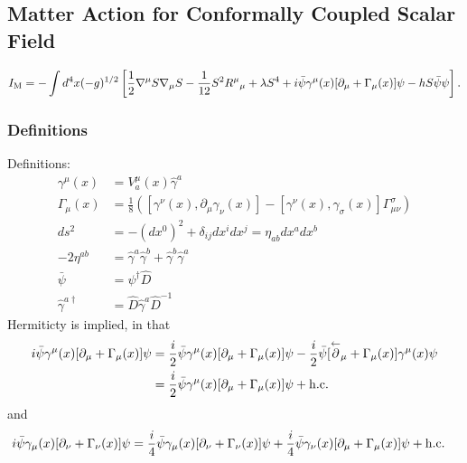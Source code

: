 \documentclass[10pt,letterpaper]{article}
\numberwithin{equation}{subsection}
\begin{document}

\subsection{Matter Action for Conformally Coupled Scalar Field}
\begin{equation}
	I_{\rm M} = -\int d^4x(-g)^{1/2} \left[ \frac12 \nabla^\mu S \nabla_\mu S - \frac{1}{12} S^2 R^{\mu}{}_{\mu} + \lambda S^4 
+ i\bar\psi\gamma^\mu(x)[\partial_\mu + \Gamma_\mu(x)]\psi -hS\bar\psi\psi\right]\label{GRW1}.
\end{equation}


\subsubsection{Definitions}
Definitions:
\begin{align}
\gamma^\mu(x) &= V^\mu_a(x)\hat \gamma ^a
\nonumber\\
\Gamma_\mu(x) &= \frac{1}{8}\left( [\gamma^\nu(x),\partial_\mu\gamma_\nu(x)] -[\gamma^\nu(x),\gamma_\sigma(x)]\Gamma^\sigma_{\mu\nu} \right)
\nonumber\\
ds^2 &= -(dx^0)^2 + \delta_{ij}dx^idx^j = \eta_{ab}dx^a dx^b
\nonumber\\
-2\eta^{ab} &= \hat \gamma^a \hat \gamma^b + \hat \gamma^b \hat\gamma^a 
\nonumber\\
\bar\psi &= \psi^\dagger \hat D
\nonumber\\
\hat \gamma^{a\dagger} &= \hat D \hat\gamma^a \hat D^{-1}
\end{align}
Hermiticty is implied, in that
\begin{align}
i\bar\psi \gamma^\mu(x)[\partial_\mu+ \Gamma_\mu(x)]\psi &= \frac{i}{2} \bar \psi\gamma^\mu(x)[\partial_\mu + \Gamma_{\mu}(x)]\psi - \frac{i}{2}
\bar\psi[\overset{\leftarrow}\partial_\mu +\Gamma_\mu(x)]\gamma^\mu(x)\psi
\nonumber\\
&= \frac{i}{2}\bar\psi\gamma^\mu(x)[\partial_\mu+\Gamma_\mu(x)]\psi + \rm{h.c.} 
\end{align}
and
\begin{align}
i\bar\psi\gamma_\mu(x)[\partial_\nu+\Gamma_\nu(x)]\psi &= \frac{i}{4}\bar\psi \gamma_\mu(x)[\partial_\nu + \Gamma_\nu(x)]\psi +
\frac{i}{4} \bar\psi \gamma_\nu(x)[\partial_\mu + \Gamma_\mu(x)]\psi + \rm{h.c.}
\end{align}

\end{document}
